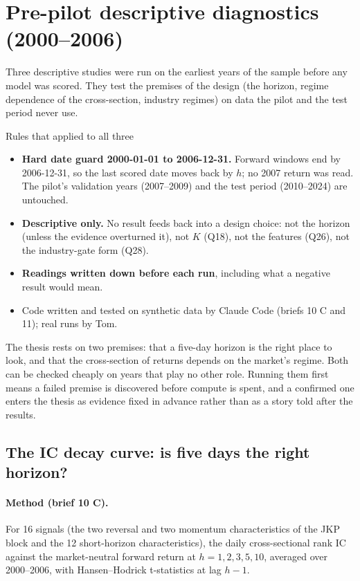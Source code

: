 \section{Pre-pilot descriptive diagnostics (2000--2006)}
\label{sec:diagnostics}

Three descriptive studies were run on the earliest years of the sample before any model was scored. They
test the premises of the design (the horizon, regime dependence of the cross-section, industry regimes)
on data the pilot and the test period never use.

\begin{keybox}{Rules that applied to all three}
\begin{itemize}
\item \textbf{Hard date guard 2000-01-01 to 2006-12-31.} Forward windows end by 2006-12-31, so the last scored
  date moves back by $h$; no 2007 return was read. The pilot's validation years (2007--2009) and the test
  period (2010--2024) are untouched.
\item \textbf{Descriptive only.} No result feeds back into a design choice: not the horizon (unless the evidence
  overturned it), not $K$ (Q18), not the features (Q26), not the industry-gate form (Q28).
\item \textbf{Readings written down before each run}, including what a negative result would mean.
\item Code written and tested on synthetic data by Claude Code (briefs 10 C and 11); real runs by Tom.
\end{itemize}
\end{keybox}

\begin{whybox}
The thesis rests on two premises: that a five-day horizon is the right place to look, and that the cross-section
of returns depends on the market's regime. Both can be checked cheaply on years that play no other role. Running
them first means a failed premise is discovered before compute is spent, and a confirmed one enters the thesis
as evidence fixed in advance rather than as a story told after the results.
\end{whybox}

\subsection{The IC decay curve: is five days the right horizon?}

\paragraph{Method (brief 10 C).} For 16 signals (the two reversal and two momentum characteristics of the JKP
block and the 12 short-horizon characteristics), the daily cross-sectional rank IC against the market-neutral
forward return at $h = 1, 2, 3, 5, 10$, averaged over 2000--2006, with Hansen--Hodrick t-statistics at lag $h-1$.

